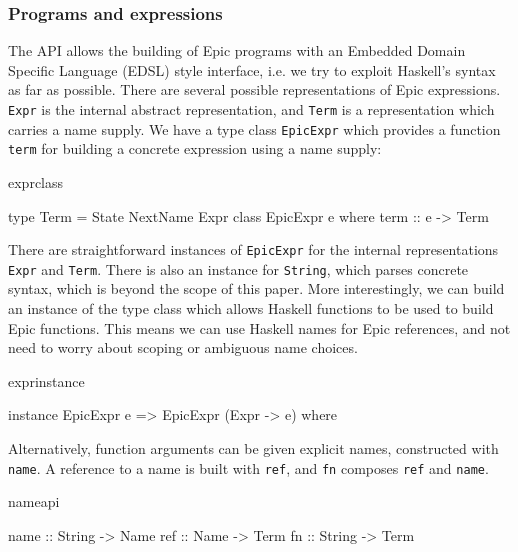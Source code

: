 \subsubsection*{Programs and expressions}

The API allows the building of Epic programs with an Embedded Domain
Specific Language (EDSL) style interface, i.e. we try to exploit
Haskell's syntax as far as possible. There are several
possible representations of Epic expressions.
\texttt{Expr} is the internal abstract representation, and
\texttt{Term} is a representation which carries a name supply. We have
a type class \texttt{EpicExpr} which provides a function \texttt{term}
for building a concrete expression using a name supply:

\begin{SaveVerbatim}{exprclass}

type Term = State NextName Expr
class EpicExpr e where
    term :: e -> Term

\end{SaveVerbatim}

\noindent
There are straightforward instances of \texttt{EpicExpr} for the
internal representations \texttt{Expr} and \texttt{Term}. There is also
an instance for \texttt{String}, which parses concrete syntax, which
is beyond the scope of this paper. More interestingly, we can build an
instance of the type class which allows Haskell functions to be used
to build Epic functions.  This means we can use Haskell names for Epic
references, and not need to worry about scoping or ambiguous name
choices. 

\begin{SaveVerbatim}{exprinstance}

instance EpicExpr e => EpicExpr (Expr -> e) where

\end{SaveVerbatim}

\noindent
Alternatively, function arguments can be given explicit names, constructed
with \texttt{name}. 
A reference to a name is built with \texttt{ref}, and
\texttt{fn} composes \texttt{ref} and \texttt{name}.

\begin{SaveVerbatim}{nameapi}

name :: String -> Name
ref  :: Name   -> Term
fn   :: String -> Term

\end{SaveVerbatim}


